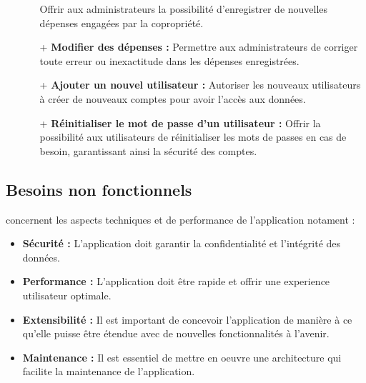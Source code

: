 \begin{itemize}
\begin{itemize}
        Offrir aux administrateurs la possibilité d'enregistrer de nouvelles dépenses engagées par la copropriété.
        \item[+] \textbf{Modifier des dépenses :}
        Permettre aux administrateurs de corriger toute erreur ou inexactitude dans les dépenses enregistrées.
        \item[+] \textbf{Ajouter un nouvel utilisateur : }
        Autoriser les nouveaux utilisateurs à créer de nouveaux comptes pour avoir l'accès aux données.
        \item[+] \textbf{Réinitialiser le mot de passe d'un utilisateur :}
        Offrir la possibilité aux utilisateurs de réinitialiser les mots de passes en cas de besoin, garantissant ainsi la sécurité des comptes.
    \end{itemize}
\end{itemize}
\subsection{Besoins non fonctionnels}
concernent les aspects techniques et de performance de l'application notament :
\begin{itemize}
    \item \textbf{Sécurité : } L'application doit garantir la confidentialité et l'intégrité des données.
    \item \textbf{Performance : } L'application doit être rapide et offrir une experience utilisateur optimale.
    \item \textbf{Extensibilité : } Il est important de concevoir l'application de manière à ce qu'elle puisse être étendue avec de nouvelles fonctionnalités à l'avenir.
    \item \textbf{Maintenance : } Il est essentiel de mettre en oeuvre une architecture qui facilite  la maintenance de l'application.
\end{itemize}
